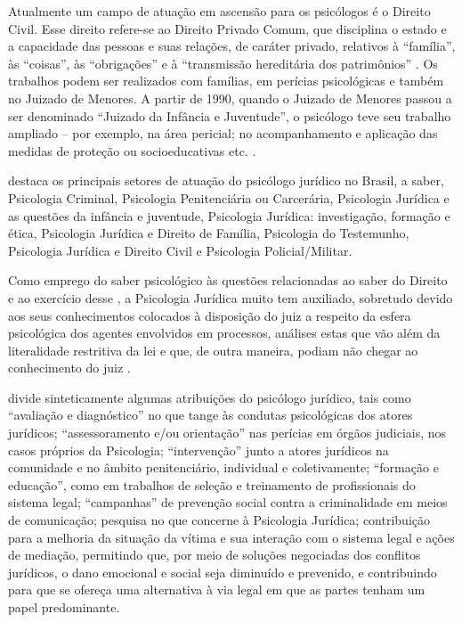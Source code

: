Atualmente um campo de atuação em ascensão para os psicólogos é o Direito Civil. Esse direito refere-se ao Direito Privado Comum, que disciplina o estado e a capacidade das pessoas e suas relações, de caráter privado, relativos à ``família'', às ``coisas'', às ``obrigações'' e à ``transmissão hereditária dos patrimônios'' . Os trabalhos podem ser realizados com famílias, em perícias psicológicas e também no Juizado de Menores. A partir de 1990, quando o Juizado de Menores passou a ser denominado ``Juizado da Infância e Juventude'', o psicólogo teve seu trabalho ampliado -- por exemplo, na área pericial; no acompanhamento e aplicação das medidas de proteção ou socioeducativas etc. .

 destaca os principais setores de atuação do psicólogo jurídico no Brasil, a saber, Psicologia Criminal, Psicologia Penitenciária ou Carcerária, Psicologia Jurídica e as questões da infância e juventude, Psicologia Jurídica: investigação, formação e ética, Psicologia Jurídica e Direito de Família, Psicologia do Testemunho, Psicologia Jurídica e Direito Civil e Psicologia Policial/Militar. 

Como emprego do saber psicológico às questões relacionadas ao saber do Direito e ao exercício desse \cite{LEAL2008}, a Psicologia Jurídica muito tem auxiliado, sobretudo devido aos seus conhecimentos colocados à disposição do juiz a respeito da esfera psicológica dos agentes envolvidos em processos, análises estas que vão além da literalidade restritiva da lei e que, de outra maneira, podiam não chegar ao conhecimento do juiz .

 divide sinteticamente algumas atribuições do psicólogo jurídico, tais como ``avaliação e diagnóstico'' no que tange às condutas psicológicas dos atores jurídicos; ``assessoramento e/ou orientação'' nas perícias em órgãos judiciais, nos casos próprios da Psicologia; ``intervenção'' junto a atores jurídicos na comunidade e no âmbito penitenciário, individual e coletivamente; ``formação e educação'', como em trabalhos de seleção e treinamento de profissionais do sistema legal; ``campanhas'' de prevenção social contra a criminalidade em meios de comunicação; pesquisa no que concerne à Psicologia Jurídica; contribuição para a melhoria da situação da vítima e sua interação com o sistema legal e ações de mediação, permitindo que, por meio de soluções negociadas dos conflitos jurídicos, o dano emocional e social seja diminuído e prevenido, e contribuindo para que se ofereça uma alternativa à via legal em que as partes tenham um papel predominante.

